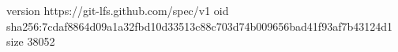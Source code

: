 version https://git-lfs.github.com/spec/v1
oid sha256:7cdaf8864d09a1a32fbd10d33513c88c703d74b009656bad41f93af7b43124d1
size 38052
